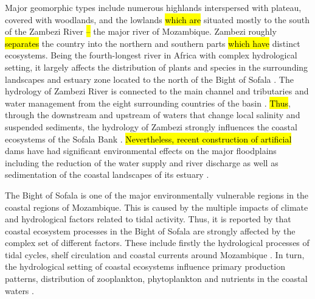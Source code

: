 \documentclass[coasts,article,submit,pdftex,moreauthors]{Definitions/mdpi}
\begin{document}
Major geomorphic types include numerous highlands interspersed with plateau, covered with woodlands, and the lowlands \hl{which are }situated mostly to the south of the Zambezi River\hl{ -- }the major river of Mozambique. Zambezi roughly \hl{separates} the country into the northern and southern parts \hl{which have} distinct ecosystems. Being the fourth-longest river in Africa with complex hydrological setting, it largely affects the distribution of plants and species in the surrounding landscapes and estuary zone located to the north of the Bight of Sofala \cite{Dunham,Dunham1991,Simasiku}. The hydrology of Zambezi River is connected to the main channel and tributaries and water management from the eight surrounding countries of the basin \cite{Mbumwae}. \hl{Thus}, through the downstream and upstream of waters that change local salinity and suspended sediments, the hydrology of Zambezi strongly influences the coastal ecosystems of the Sofala Bank \cite{NEHAMA2021101891}. \hl{Nevertheless, recent construction of artificial} dams have had significant environmental effects on the major floodplains including the reduction of the water supply and river discharge \cite{Gope} as well as sedimentation of the coastal landscapes of its estuary \cite{Moore}. 

The Bight of Sofala is one of the major environmentally vulnerable regions in the coastal regions of Mozambique. This is caused by the multiple impacts of climate and hydrological factors related to tidal activity. Thus, it is reported by \cite{LEAL2009605} that\hl{ }coastal ecosystem processes in the Bight of Sofala are strongly affected by the complex set of different factors. These include firstly the hydrological processes of tidal cycles, shelf circulation and coastal currents around Mozambique \cite{MALAUENE20181}. In turn, the hydrological setting of coastal ecosystems influence primary production patterns, distribution of zooplankton, phytoplankton and nutrients in the coastal waters \cite{MALAUENE2021107268}.
\end{document}
